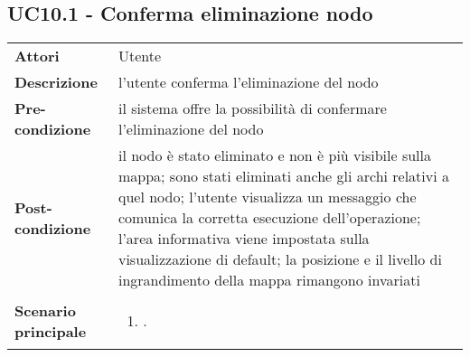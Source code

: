 \subsection{UC10.1 - Conferma eliminazione nodo} 
\label{sssec:UC10.1} 
\def\arraystretch{1.5}
\begin{tabularx}{\textwidth}{l|p{}}
	\rowcolor{I} \multicolumn{2}{c}{\color{white}\textbf{UC10.1 - Conferma eliminazione nodo}} \\
	\toprule
	\endhead
	\textbf{Attori} & Utente\\
	\textbf{Descrizione} & l'utente conferma l'eliminazione del nodo\\
	\textbf{Pre-condizione} & il sistema offre la possibilità di confermare l'eliminazione del nodo\\
	\textbf{Post-condizione} & il nodo è stato eliminato e non è più visibile sulla mappa; sono stati eliminati anche gli archi relativi a quel nodo; l'utente visualizza un messaggio che comunica la corretta esecuzione dell'operazione; l'area informativa viene impostata sulla visualizzazione di default;  la posizione e il livello di ingrandimento della mappa rimangono invariati\\
	\textbf{Scenario principale} & \vspace{-1.2em}\begin{enumerate}[leftmargin=*,noitemsep,nosep]
		\item \nameref{sssec:UC10.1}.
	\end{enumerate}\\
	\bottomrule
\end{tabularx}
